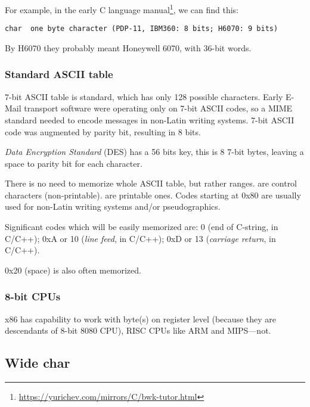 For example, in the early C language manual\footnote{\url{https://yurichev.com/mirrors/C/bwk-tutor.html}}, we can find this:

\begin{lstlisting}
char  one byte character (PDP-11, IBM360: 8 bits; H6070: 9 bits)
\end{lstlisting}

By H6070 they probably meant Honeywell 6070, with 36-bit words.

\subsubsection{Standard ASCII table}

7-bit ASCII table is standard, which has only 128 possible characters.
Early E-Mail transport software were operating only on 7-bit ASCII codes, so a \ac{MIME} standard needed to encode messages
in non-Latin writing systems.
7-bit ASCII code was augmented by parity bit, resulting in 8 bits.

\emph{Data Encryption Standard} (\ac{DES}) has a 56 bits key, this is 8 7-bit bytes,
leaving a space to parity bit for each character.

There is no need to memorize whole \ac{ASCII} table, but rather ranges.
 are control characters (non-printable).
 are printable ones.
Codes starting at 0x80 are usually used for non-Latin writing systems and/or pseudographics.

Significant codes which will be easily memorized are:
0 (end of C-string,  in C/C++);
0xA or 10 (\emph{line feed},  in C/C++);
0xD or 13 (\emph{carriage return},  in C/C++).

0x20 (space) is also often memorized.

\subsubsection{8-bit CPUs}

x86 has capability to work with byte(s) on register level (because they are descendants of 8-bit 8080 CPU),
RISC CPUs like ARM and MIPS---not.

\subsection{Wide char}

